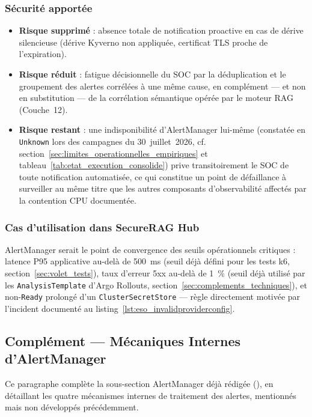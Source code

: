 \subsubsection{Sécurité apportée}
\begin{itemize}
    \item \textbf{Risque supprimé} : absence totale de notification proactive en cas de dérive silencieuse (dérive Kyverno non appliquée, certificat TLS proche de l'expiration).
    \item \textbf{Risque réduit} : fatigue décisionnelle du SOC par la déduplication et le groupement des alertes corrélées à une même cause, en complément — et non en substitution — de la corrélation sémantique opérée par le moteur RAG (Couche~12).
    \item \textbf{Risque restant} : une indisponibilité d'AlertManager lui-même (constatée en \texttt{Unknown} lors des campagnes du 30~juillet~2026, cf. section~\ref{sec:limites_operationnelles_empiriques} et tableau~\ref{tab:etat_execution_consolide}) prive transitoirement le SOC de toute notification automatisée, ce qui constitue un point de défaillance à surveiller au même titre que les autres composants d'observabilité affectés par la contention CPU documentée.
\end{itemize}

\subsubsection{Cas d'utilisation dans SecureRAG Hub}
AlertManager serait le point de convergence des seuils opérationnels critiques : latence P95 applicative au-delà de 500~ms (seuil déjà défini pour les tests k6, section~\ref{sec:volet_tests}), taux d'erreur 5xx au-delà de 1~\% (seuil déjà utilisé par les \texttt{AnalysisTemplate} d'Argo Rollouts, section~\ref{sec:complements_techniques}), et non-\texttt{Ready} prolongé d'un \texttt{ClusterSecretStore} — règle directement motivée par l'incident documenté au listing~\ref{lst:eso_invalidproviderconfig}.

\subsection*{Complément — Mécaniques Internes d'AlertManager}

Ce paragraphe complète la sous-section AlertManager déjà rédigée (\label{subsec:alertmanager_v2_ref}\label{par:alertmanager_mecaniques_v2}), en détaillant les quatre mécanismes internes de traitement des alertes, mentionnés mais non développés précédemment.

